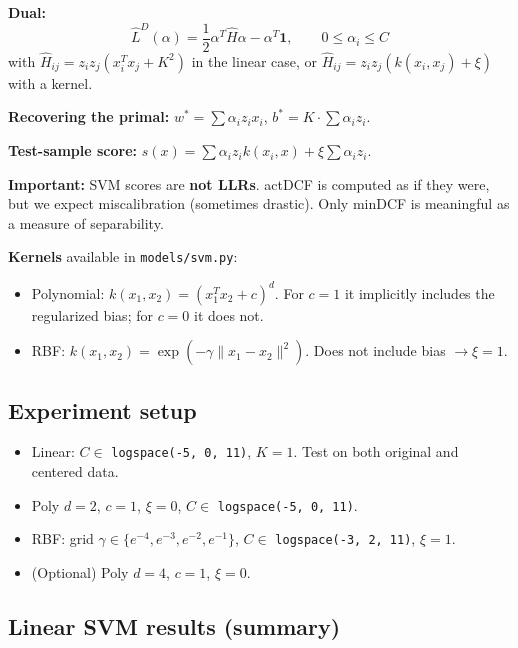\documentclass[11pt,a4paper]{article}
\begin{document}
\textbf{Dual:}
\[
\hat{L}^D(\alpha) = \frac{1}{2}\alpha^T \hat{H}\alpha - \alpha^T \mathbf{1},
\qquad 0 \leq \alpha_i \leq C
\]
with $\hat{H}_{ij} = z_i z_j (x_i^T x_j + K^2)$ in the linear case, or
$\hat{H}_{ij} = z_i z_j (k(x_i, x_j) + \xi)$ with a kernel.

\textbf{Recovering the primal:} $w^* = \sum \alpha_i z_i x_i$,
$b^* = K \cdot \sum \alpha_i z_i$.

\textbf{Test-sample score:}
$s(x) = \sum \alpha_i z_i k(x_i, x) + \xi \sum \alpha_i z_i$.

\textbf{Important:} SVM scores are \textbf{not LLRs}. actDCF is
computed as if they were, but we expect miscalibration (sometimes
drastic). Only minDCF is meaningful as a measure of separability.

\textbf{Kernels} available in \texttt{models/svm.py}:
\begin{itemize}
\item Polynomial: $k(x_1, x_2) = (x_1^T x_2 + c)^d$. For $c=1$ it
      implicitly includes the regularized bias; for $c=0$ it does not.
\item RBF: $k(x_1, x_2) = \exp(-\gamma\|x_1 - x_2\|^2)$. Does not
      include bias $\rightarrow \xi=1$.
\end{itemize}

\subsection{Experiment setup}

\begin{itemize}
\item Linear: $C \in$ \texttt{logspace(-5, 0, 11)}, $K=1$.
      Test on both original and centered data.
\item Poly $d=2$, $c=1$, $\xi=0$, $C \in$ \texttt{logspace(-5, 0, 11)}.
\item RBF: grid $\gamma \in \{e^{-4}, e^{-3}, e^{-2}, e^{-1}\}$,
      $C \in$ \texttt{logspace(-3, 2, 11)}, $\xi=1$.
\item (Optional) Poly $d=4$, $c=1$, $\xi=0$.
\end{itemize}

\subsection{Linear SVM results (summary)}
\end{document}
